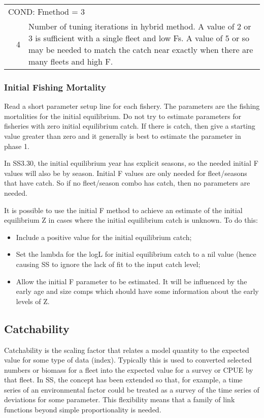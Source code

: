\begin{longtable}{p{1cm} p{3cm} p{11cm}}
   \multicolumn{3}{l}{COND: Fmethod = 3}\Tstrut\\
   & 4 & Number of tuning iterations in hybrid method. A value of 2 or 3 is sufficient with a single fleet and low Fs.  A value of 5 or so may be needed to match the catch near exactly when there are many fleets and high F. \Bstrut\\
   \hline
\end{longtable}

\subsubsection{Initial Fishing Mortality}
Read a short parameter setup line for each fishery.  The parameters are the fishing mortalities for the initial equilibrium.  Do not try to estimate parameters for fisheries with zero initial equilibrium catch.  If there is catch, then give a starting value greater than zero and it generally is best to estimate the parameter in phase 1.

In SS3.30, the initial equilibrium year has explicit seasons, so the needed initial F values will also be by season.  Initial F values are only needed for fleet/seasons that have catch.  So if no fleet/season combo has catch, then no parameters are needed.

It is possible to use the initial F method to achieve an estimate of the initial equilibrium Z in cases where the initial equilibrium catch is unknown.  To do this:
\begin{itemize}
	\item Include a positive value for the initial equilibrium catch;
	\item Set the lambda for the logL for initial equilibrium catch to a nil value (hence causing SS to ignore the lack of fit to the input catch level;
	\item Allow the initial F parameter to be estimated.  It will be influenced by the early age and size comps which should have some information about the early levels of Z.
\end{itemize}

\hypertarget{Qsetup}{}
\subsection{Catchability}
Catchability is the scaling factor that relates a model quantity to the expected value for some type of data (index).  Typically this is used to converted selected numbers or biomass for a fleet into the expected value for a survey or CPUE by that fleet.  In SS, the concept has been extended so that, for example, a time series of an environmental factor could be treated as a survey of the time series of deviations for some parameter.  This flexibility means that a family of link functions beyond simple proportionality is needed.

